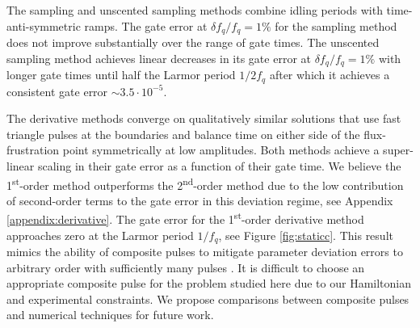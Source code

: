 The sampling and unscented sampling methods combine idling periods
with time-anti-symmetric ramps.
The gate error at $\delta f_{q} / f_{q} = 1\%$ for the sampling method
does not improve substantially over the
range of gate times. The unscented sampling method
achieves linear decreases in its gate error at
$\delta f_{q} / f_{q} = 1\%$ with longer gate times
until half the Larmor period $1 / 2 f_{q}$ after which it achieves a consistent
gate error $\sim 3.5 \cdot 10^{-5}$.

The derivative methods converge on qualitatively similar solutions that
use fast triangle pulses at the boundaries and balance time
on either side of the flux-frustration point symmetrically at low amplitudes.
Both methods achieve a super-linear scaling in their gate error as
a function of their gate time.
We believe the 1\textsuperscript{st}-order method outperforms the 2\textsuperscript{nd}-order
method due to the low contribution of second-order
terms to the gate error in this deviation regime, see Appendix \ref{appendix:derivative}.
The gate error for the 1\textsuperscript{st}-order
derivative method approaches zero at the Larmor period $1 / f_{q}$, see Figure \ref{fig:staticc}.
This result mimics the
ability of composite pulses to mitigate parameter deviation errors to arbitrary
order with sufficiently many pulses \cite{merrill2014progress}.
It is difficult to choose an appropriate composite pulse
for the problem studied here due to our Hamiltonian and experimental constraints.
We propose comparisons between composite pulses and numerical techniques
for future work.

